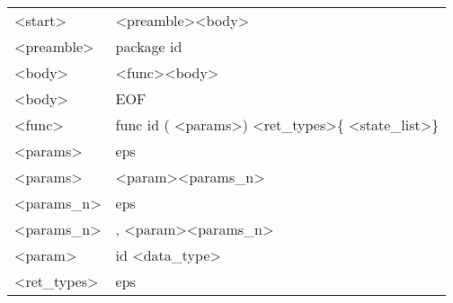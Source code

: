 \documentclass{article}
\begin{document}
\begin{table}[]
\begin{tabular}{l|l}
\textless{}start\textgreater{}          & \textless{}preamble\textgreater \textless{}body\textgreater{}                                                                                        \\
\textless{}preamble\textgreater{}       & package id                                                                                                                                           \\
\textless{}body\textgreater{}           & \textless{}func\textgreater \textless{}body\textgreater{}                                                                                            \\
\textless{}body\textgreater{}           & EOF                                                                                                                                                  \\
\textless{}func\textgreater{}           & func id ( \textless{}params\textgreater ) \textless{}ret\_types\textgreater \{ \textless{}state\_list\textgreater \}                                 \\
\textless{}params\textgreater{}         & eps                                                                                                                                                  \\
\textless{}params\textgreater{}         & \textless{}param\textgreater \textless{}params\_n\textgreater{}                                                                                      \\
\textless{}params\_n\textgreater{}      & eps                                                                                                                                                  \\
\textless{}params\_n\textgreater{}      & , \textless{}param\textgreater \textless{}params\_n\textgreater{}                                                                                    \\
\textless{}param\textgreater{}          & id \textless{}data\_type\textgreater{}                                                                                                               \\
\textless{}ret\_types\textgreater{}     & eps                                                                                                                                                  \\

\end{tabular}
\end{table}
\end{document}
